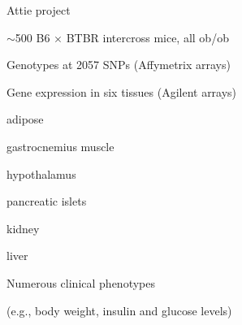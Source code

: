\documentclass[12pt]{article}
\newcommand{\headsize}{\fontsize{35}{35} \selectfont}
\newcommand{\smallsize}{\fontsize{25}{30} \selectfont}
\newcommand{\smallersize}{\fontsize{20}{25} \selectfont}
\newcommand{\smallestsize}{\fontsize{18}{22} \selectfont}
\begin{document}
\newpage

\headsize \color{myyellow}
\hfill
\begin{minipage}{5.75in}
\centering
Attie project
\end{minipage}

\vspace{20mm}

\hfill \begin{minipage}{10in}

\smallsize
\color{mypink}
$\sim$500 B6 $\times$ BTBR intercross mice, all ob/ob

\smallersize
\vspace{10mm}

\hfill \begin{minipage}{9in}
\color{mywhite}

Genotypes at 2057 SNPs (Affymetrix arrays)

\vspace{5mm}

Gene expression in six tissues (Agilent arrays)

{\color{myblue} \smallestsize
\hspace{20mm} adipose

\hspace{20mm} gastrocnemius muscle

\hspace{20mm}  hypothalamus

\hspace{20mm} pancreatic islets

\hspace{20mm} kidney

\hspace{20mm} liver
}
\vspace{5mm}

Numerous clinical phenotypes

{\color{myblue}  \smallestsize
\hspace{20mm} (e.g., body weight, insulin and glucose
levels)
}

%
%
%
%



\end{minipage}

\end{minipage}
\end{document}
